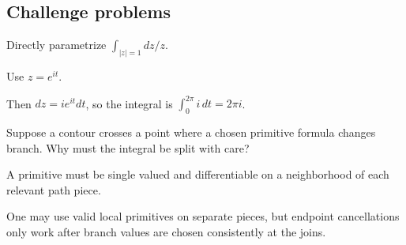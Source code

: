 \subsection*{Challenge problems}

\begin{exercise}\label{exr:iv04-expand-15}
Directly parametrize \(\int_{|z|=1} dz/z\).
\end{exercise}
\begin{hint}
Use \(z=e^{it}\).
\end{hint}
\begin{solution}
Then \(dz=ie^{it}dt\), so the integral is \(\int_0^{2\pi}i\,dt=2\pi i\).
\end{solution}

\begin{exercise}\label{exr:iv04-expand-16}
Suppose a contour crosses a point where a chosen primitive formula changes branch. Why must the integral be split with care?
\end{exercise}
\begin{hint}
A primitive must be single valued and differentiable on a neighborhood of each relevant path piece.
\end{hint}
\begin{solution}
One may use valid local primitives on separate pieces, but endpoint cancellations only work after branch values are chosen consistently at the joins.
\end{solution}

